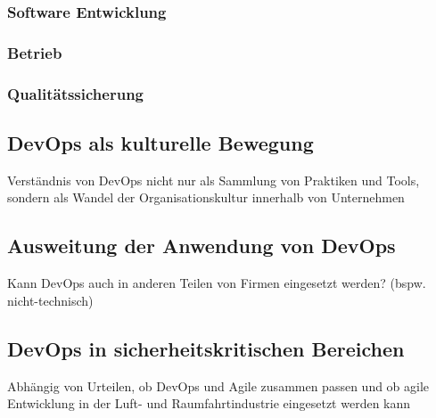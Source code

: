 \subsubsection{Software Entwicklung}

\subsubsection{Betrieb}

\subsubsection{Qualitätssicherung}

\subsection{DevOps als kulturelle Bewegung}
Verständnis von DevOps nicht nur als Sammlung von Praktiken und Tools, sondern als Wandel
der Organisationskultur innerhalb von Unternehmen

\subsection{Ausweitung der Anwendung von DevOps}
Kann DevOps auch in anderen Teilen von Firmen eingesetzt werden? (bspw. nicht-technisch)

\subsection{DevOps in sicherheitskritischen Bereichen}
Abhängig von Urteilen, ob DevOps und Agile zusammen passen und ob agile Entwicklung in der
Luft- und Raumfahrtindustrie eingesetzt werden kann
